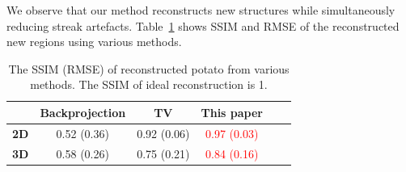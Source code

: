 \documentclass[journal]{IEEEtran}
\begin{document}
We observe
that our method reconstructs new structures while simultaneously
reducing streak artefacts. Table~\ref{table:potato_ssim} shows SSIM and RMSE of
the reconstructed new regions using various methods.

\begin{table}[!h]
  \centering
  \caption{The SSIM (RMSE) of reconstructed potato from various
    methods. The SSIM of ideal reconstruction is 1.}
\begin{tabular}{|l|c|c|c|c|c|}
\hline &
\textbf{Backprojection} & \textbf{TV} &
\textbf{This paper} \\ \hline \textbf{2D} & 0.52 (0.36)
& 0.92 (0.06) & \textcolor{red}{0.97 (0.03)} \\ \hline \textbf{3D} & 0.58 (0.26) & 0.75 (0.21) & \textcolor{red}{0.84 (0.16)}
\\ \hline
\end{tabular}
\label{table:potato_ssim}
\end{table}
\end{document}
